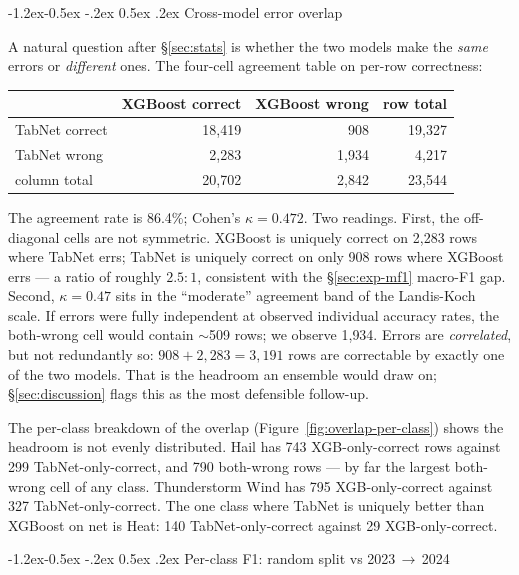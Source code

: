 \documentclass[11pt]{article}
\makeatletter
\renewcommand\subsection{\@startsection{subsection}{2}{\z@}%
  {-1.2ex\@plus -0.5ex \@minus -.2ex}%
  {0.5ex \@plus .2ex}%
  {\normalfont\normalsize\bfseries}}
\newcommand{\mF}{macro-F1}
\makeatother
\begin{document}
\subsection{Cross-model error overlap}\label{sec:errors-overlap}

A natural question after \S\ref{sec:stats} is whether the two
models make the \emph{same} errors or \emph{different} ones. The
four-cell agreement table on per-row correctness:

\begin{center}
\small
\begin{tabular}{lrrr}
\toprule
                       & XGBoost correct & XGBoost wrong & row total \\
\midrule
TabNet correct          & 18{,}419 &    908 & 19{,}327 \\
TabNet wrong            &  2{,}283 &  1{,}934 &  4{,}217 \\
column total            & 20{,}702 &  2{,}842 & 23{,}544 \\
\bottomrule
\end{tabular}
\end{center}

The agreement rate is 86.4\%; Cohen's $\kappa = 0.472$. Two
readings. First, the off-diagonal cells are not symmetric. XGBoost
is uniquely correct on 2{,}283 rows where TabNet errs; TabNet is
uniquely correct on only 908 rows where XGBoost errs --- a ratio of
roughly $2.5:1$, consistent with the \S\ref{sec:exp-mf1} \mF{} gap.
Second, $\kappa = 0.47$ sits in the ``moderate'' agreement band of
the Landis-Koch scale. If errors were fully independent at observed
individual accuracy rates, the both-wrong cell would contain
$\sim$509 rows; we observe 1{,}934. Errors are \emph{correlated},
but not redundantly so: $908 + 2{,}283 = 3{,}191$ rows are
correctable by exactly one of the two models. That is the headroom
an ensemble would draw on; \S\ref{sec:discussion} flags this as the
most defensible follow-up.

The per-class breakdown of the overlap
(Figure~\ref{fig:overlap-per-class}) shows the headroom is not
evenly distributed. Hail has 743 XGB-only-correct rows against 299
TabNet-only-correct, and 790 both-wrong rows --- by far the largest
both-wrong cell of any class. Thunderstorm Wind has 795
XGB-only-correct against 327 TabNet-only-correct. The one class
where TabNet is uniquely better than XGBoost on net is Heat: 140
TabNet-only-correct against 29 XGB-only-correct.

\subsection{Per-class F1: random split vs 2023\,$\rightarrow$\,2024}\label{sec:errors-perclass}
\end{document}
